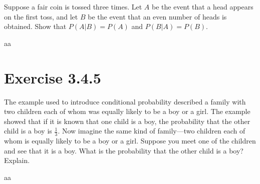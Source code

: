 \documentclass[titlepage, letterpaper, fleqn]{article}
\newcommand{\spacepls}{\vspace{5mm}}
\begin{document}
{\large Suppose a fair coin is tossed three times.
Let \(A\) be the event that a head appears on the first toss,
and let \(B\) be the event that an even number of heads is obtained.
Show that \(P(A \vert B) = P(A)\) and \(P(B \vert A) = P(B)\)}.

\spacepls

aa

\section{Exercise 3.4.5}

{\large The example used to introduce conditional probability described a family with two children each of whom was equally likely to be a boy or a girl.
The example showed that if it is known that one child is a boy,
the probability that the other child is a boy is \(\frac{1}{3}\).
Now imagine the same kind of family—two children each of whom is equally likely to be a boy or a girl.
Suppose you meet one of the children and see that it is a boy.
What is the probability that the other child is a boy? Explain}.

\spacepls

aa
\end{document}
